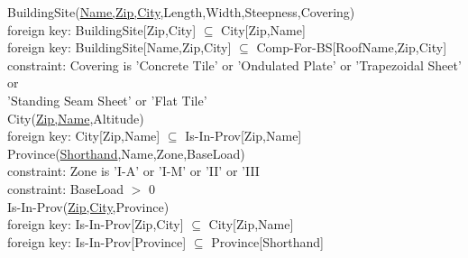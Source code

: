 \documentclass{article}[h]
\begin{document}
{{\color{ForestGreen}BuildingSite(\underline{Name,Zip,City},Length,Width,Steepness,Covering)}\\
{\color{Orange}\hspace{2mm} foreign key: {\color{Magenta}BuildingSite[Zip,City] $\subseteq$ City[Zip,Name]}} \\
{\color{Orange}\hspace{2mm} foreign key: {\color{Magenta}BuildingSite[Name,Zip,City] $\subseteq$ Comp-For-BS[RoofName,Zip,City]}} \\
{\color{Orange}\hspace{2mm} constraint: {\color{Magenta}Covering is 'Concrete Tile' or 'Ondulated Plate' or 'Trapezoidal Sheet' or}} \\
{\color{Magenta}\hspace{22.5mm}'Standing Seam Sheet' or 'Flat Tile'}\\

{\color{ForestGreen}City(\underline{Zip,Name},Altitude)}\\
{\color{Orange}\hspace{2mm} foreign key: {\color{Magenta}City[Zip,Name] $\subseteq$ Is-In-Prov[Zip,Name]}} \\

{\color{ForestGreen}Province(\underline{Shorthand},Name,Zone,BaseLoad)}\\
{\color{Orange}\hspace{2mm} constraint: {\color{Magenta}Zone is 'I-A' or 'I-M' or 'II' or 'III}} \\
{\color{Orange}\hspace{2mm} constraint: {\color{Magenta}BaseLoad $>$ 0}} \\

{\color{ForestGreen}Is-In-Prov(\underline{Zip,City},Province)}\\
{\color{Orange}\hspace{2mm} foreign key: {\color{Magenta}Is-In-Prov[Zip,City] $\subseteq$ City[Zip,Name]}} \\
{\color{Orange}\hspace{2mm} foreign key: {\color{Magenta}Is-In-Prov[Province] $\subseteq$ Province[Shorthand]}} \\

}
\end{document}
